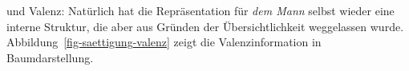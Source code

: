 und Valenz:
\ea
\label{ms-dem-mann-gibt}
\z
Natürlich hat die Repräsentation für \emph{dem Mann} selbst wieder eine interne Struktur,
die aber aus Gründen der Übersichtlichkeit weggelassen wurde.
Abbildung~\vref{fig-saettigung-valenz} zeigt die Valenzinformation in Baumdarstellung.

